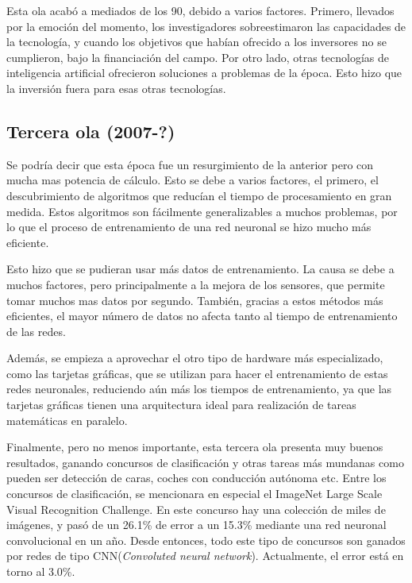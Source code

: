 \documentclass[12pt]{book}
\numberwithin{equation}{section}
\begin{document}
Esta ola acabó a mediados de los 90, debido a varios factores. Primero, llevados por la emoción del momento, los investigadores sobreestimaron las capacidades de la tecnología, y cuando los objetivos que habían ofrecido a los inversores no se cumplieron, bajo la financiación del campo. Por otro lado, otras tecnologías de inteligencia artificial ofrecieron soluciones a problemas de la época. Esto hizo que la inversión fuera para esas otras tecnologías.

\subsection{Tercera ola (2007-?)}
Se podría decir que esta época fue un resurgimiento de la anterior pero con mucha mas potencia de cálculo.  Esto se debe a varios factores, el primero, el descubrimiento de algoritmos que reducían el tiempo de procesamiento en gran medida\cite{doi:10.1162/neco.2006.18.7.1527}. Estos algoritmos son fácilmente generalizables a muchos problemas, por lo que el proceso de entrenamiento de una red neuronal se hizo mucho más eficiente.


Esto hizo que se pudieran usar más datos de entrenamiento. La causa se debe a muchos factores, pero principalmente a la mejora de los sensores, que permite tomar muchos mas datos por segundo. También, gracias a estos métodos más eficientes, el mayor número de datos no afecta tanto al tiempo de entrenamiento de las redes.

Además, se empieza a aprovechar el otro tipo de hardware más especializado, como las tarjetas gráficas, que se utilizan para hacer el entrenamiento de estas redes neuronales, reduciendo aún más los tiempos de entrenamiento, ya que las tarjetas gráficas tienen una arquitectura ideal para realización de tareas matemáticas en paralelo.

Finalmente, pero no menos importante, esta tercera ola presenta muy buenos resultados, ganando concursos de clasificación y otras tareas más mundanas como pueden ser detección de caras, coches con conducción autónoma etc. Entre los concursos de clasificación, se mencionara en especial el ImageNet Large Scale Visual Recognition Challenge. En este concurso hay una colección de miles de imágenes, y pasó de un 26.1\% de error a un 15.3\%\cite{concursos} mediante una red neuronal convolucional en un año. Desde entonces, todo este tipo de concursos son ganados por redes de tipo CNN(\textit{Convoluted neural network}). Actualmente, el error está en torno al 3.0\%.
\end{document}
